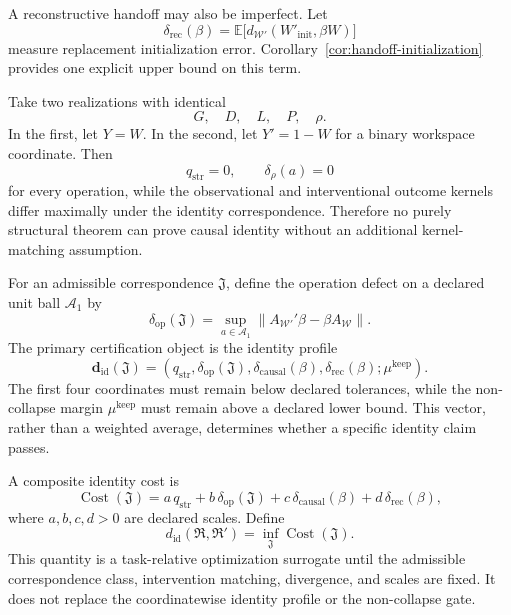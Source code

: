 A reconstructive handoff may also be imperfect. Let
\[
\delta_{\mathrm{rec}}(\beta)
=
\mathbb E\bigl[d_{\mathcal W'}(W'_{\mathrm{init}},\beta W)\bigr]
\]
measure replacement initialization error. Corollary~\ref{cor:handoff-initialization}
provides one explicit upper bound on this term.


Take two realizations with identical
\[
G,
\quad D,
\quad L,
\quad P,
\quad \rho.
\]
In the first, let \(Y=W\). In the second, let \(Y'=1-W\) for a binary
workspace coordinate. Then
\[
q_{\mathrm{str}}=0,
\qquad
\delta_\rho(a)=0
\]
for every operation, while the observational and interventional outcome
kernels differ maximally under the identity correspondence. Therefore no
purely structural theorem can prove causal identity without an additional
kernel-matching assumption.


For an admissible correspondence \(\mathfrak J\), define the operation defect
on a declared unit ball \(\mathcal A_1\) by
\[
\delta_{\mathrm{op}}(\mathfrak J)
=
\sup_{a\in\mathcal A_1}
\|A_{\mathcal W'}'\beta-\beta A_{\mathcal W}\|.
\]
The primary certification object is the identity profile
\[
\boxed{
\mathbf d_{\mathrm{id}}(\mathfrak J)
=
\left(
q_{\mathrm{str}},
\delta_{\mathrm{op}}(\mathfrak J),
\delta_{\mathrm{causal}}(\beta),
\delta_{\mathrm{rec}}(\beta);
\mu^{\mathrm{keep}}
\right).
}
\]
The first four coordinates must remain below declared tolerances, while the
non-collapse margin \(\mu^{\mathrm{keep}}\) must remain above a declared lower
bound. This vector, rather than a weighted average, determines whether a
specific identity claim passes.

A composite identity cost is
\[
\boxed{
\operatorname{Cost}(\mathfrak J)
=
a\,q_{\mathrm{str}}
+b\,\delta_{\mathrm{op}}(\mathfrak J)
+c\,\delta_{\mathrm{causal}}(\beta)
+d\,\delta_{\mathrm{rec}}(\beta),
}
\]
where \(a,b,c,d>0\) are declared scales. Define
\[
\boxed{
d_{\mathrm{id}}(\mathfrak R,\mathfrak R')
=
\inf_{\mathfrak J}
\operatorname{Cost}(\mathfrak J).
}
\]
This quantity is a task-relative optimization surrogate until the
admissible correspondence class, intervention matching, divergence, and scales
are fixed. It does not replace the coordinatewise identity profile or the
non-collapse gate.


